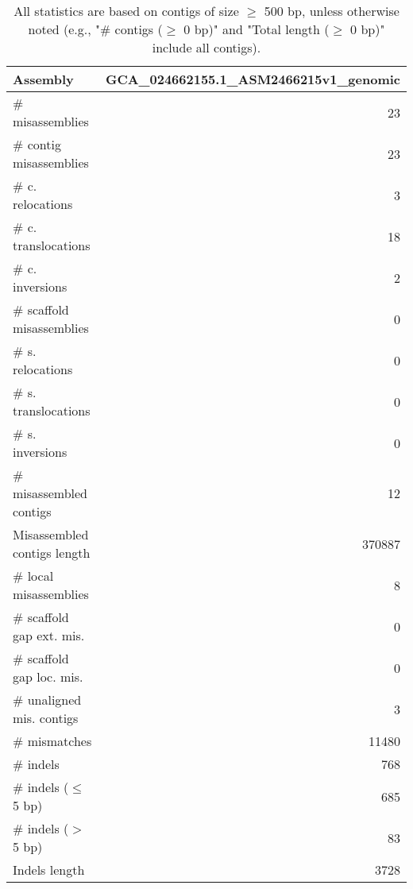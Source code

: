 \documentclass[12pt,a4paper]{article}
\begin{document}
\begin{table}[ht]
\begin{center}
\caption{All statistics are based on contigs of size $\geq$ 500 bp, unless otherwise noted (e.g., "\# contigs ($\geq$ 0 bp)" and "Total length ($\geq$ 0 bp)" include all contigs).}
\begin{tabular}{|l*{1}{|r}|}
\hline
Assembly & GCA\_024662155.1\_ASM2466215v1\_genomic \\ \hline
\# misassemblies & 23 \\ \hline
\hspace{2mm}\# contig misassemblies & 23 \\ \hline
\hspace{5mm}\# c. relocations & 3 \\ \hline
\hspace{5mm}\# c. translocations & 18 \\ \hline
\hspace{5mm}\# c. inversions & 2 \\ \hline
\hspace{2mm}\# scaffold misassemblies & 0 \\ \hline
\hspace{5mm}\# s. relocations & 0 \\ \hline
\hspace{5mm}\# s. translocations & 0 \\ \hline
\hspace{5mm}\# s. inversions & 0 \\ \hline
\# misassembled contigs & 12 \\ \hline
Misassembled contigs length & 370887 \\ \hline
\# local misassemblies & 8 \\ \hline
\# scaffold gap ext. mis. & 0 \\ \hline
\# scaffold gap loc. mis. & 0 \\ \hline
\# unaligned mis. contigs & 3 \\ \hline
\# mismatches & 11480 \\ \hline
\# indels & 768 \\ \hline
\hspace{5mm}\# indels ($\leq$ 5 bp) & 685 \\ \hline
\hspace{5mm}\# indels ($>$ 5 bp) & 83 \\ \hline
Indels length & 3728 \\ \hline
\end{tabular}
\end{center}
\end{table}
\end{document}
